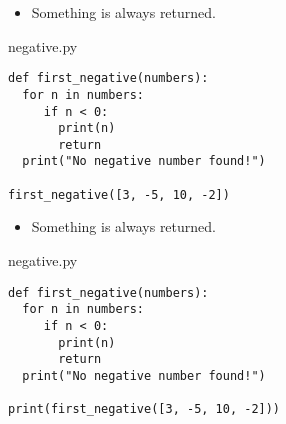 \documentclass[aspectratio=1610,slidestop]{beamer}
\begin{document}
\begin{pframe}
 \begin{itemize}
  \item Something is always returned.
 \end{itemize}
 \medskip

 \begin{minipage}[t]{0.52\textwidth}
  \begin{pythonfile}{negative.py}
   \begin{verbatim}
def first_negative(numbers):
  for n in numbers:
     if n < 0:
       print(n)
       return
  print("No negative number found!")

first_negative([3, -5, 10, -2])
   \end{verbatim}
  \end{pythonfile}
 \end{minipage}\qquad
 \begin{minipage}[t]{0.42\textwidth}
 \vspace{-4.15cm}
 \begin{terminal}
 \end{terminal}
 \end{minipage}
\end{pframe}


\begin{pframe}
 \addtocounter{framenumber}{-1}
 \begin{itemize}
  \item Something is always returned.
 \end{itemize}
 \medskip

 \begin{minipage}[t]{0.52\textwidth}
  \begin{pythonfile}{negative.py}
   \begin{verbatim}
def first_negative(numbers):
  for n in numbers:
     if n < 0:
       print(n)
       return
  print("No negative number found!")

print(first_negative([3, -5, 10, -2]))
   \end{verbatim}
  \end{pythonfile}
 \end{minipage}\qquad
 \pause
 \begin{minipage}[t]{0.42\textwidth}
 \vspace{-4.15cm}
 \begin{terminal}
 \end{terminal}
 \end{minipage}
\end{pframe}
\end{document}
